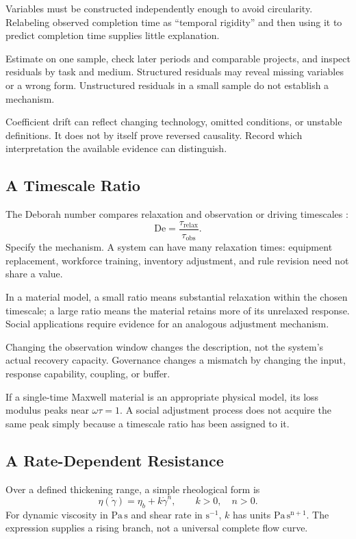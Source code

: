 \documentclass[11pt,openany]{book}
\begin{document}
Variables must be constructed independently enough to avoid circularity. Relabeling observed completion time as “temporal rigidity” and then using it to predict completion time supplies little explanation.

Estimate on one sample, check later periods and comparable projects, and inspect residuals by task and medium. Structured residuals may reveal missing variables or a wrong form. Unstructured residuals in a small sample do not establish a mechanism.

Coefficient drift can reflect changing technology, omitted conditions, or unstable definitions. It does not by itself prove reversed causality. Record which interpretation the available evidence can distinguish.

\subsection{A Timescale Ratio}

The Deborah number compares relaxation and observation or driving timescales \cite{reiner1964deborah}:
\begin{equation}
 \mathrm{De}=\frac{\tau_{\mathrm{relax}}}
                  {\tau_{\mathrm{obs}}}.
\end{equation}
Specify the mechanism. A system can have many relaxation times: equipment replacement, workforce training, inventory adjustment, and rule revision need not share a value.

In a material model, a small ratio means substantial relaxation within the chosen timescale; a large ratio means the material retains more of its unrelaxed response. Social applications require evidence for an analogous adjustment mechanism.

Changing the observation window changes the description, not the system's actual recovery capacity. Governance changes a mismatch by changing the input, response capability, coupling, or buffer.

If a single-time Maxwell material is an appropriate physical model, its loss modulus peaks near $\omega\tau=1$. A social adjustment process does not acquire the same peak simply because a timescale ratio has been assigned to it.

\subsection{A Rate-Dependent Resistance}

Over a defined thickening range, a simple rheological form is
\begin{equation}
 \eta(\dot\gamma)=\eta_b+k\dot\gamma^n,
 \qquad k>0,\quad n>0.
\end{equation}
For dynamic viscosity in $\mathrm{Pa\,s}$ and shear rate in $\mathrm{s^{-1}}$, $k$ has units $\mathrm{Pa\,s^{n+1}}$. The expression supplies a rising branch, not a universal complete flow curve.
\end{document}
